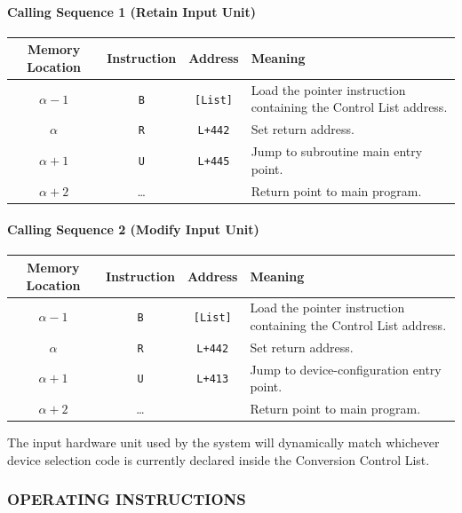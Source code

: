 \paragraph{Calling Sequence 1 (Retain Input Unit)}
\begin{table}[h!]
\centering
\begin{tabularx}{\textwidth}{cccX}
\toprule
\textbf{Memory Location} & \textbf{Instruction} & \textbf{Address} & \textbf{Meaning} \\
\midrule
$\alpha-1$   & \texttt{B} & \texttt{[List]} & Load the pointer instruction containing the Control List address. \\
$\alpha$     & \texttt{R} & \texttt{L+442}  & Set return address. \\
$\alpha+1$   & \texttt{U} & \texttt{L+445}  & Jump to subroutine main entry point. \\
$\alpha+2$   & \dots      &                  & Return point to main program. \\
\bottomrule
\end{tabularx}
\end{table}

\paragraph{Calling Sequence 2 (Modify Input Unit)}
\begin{table}[h!]
\centering
\begin{tabularx}{\textwidth}{cccX}
\toprule
\textbf{Memory Location} & \textbf{Instruction} & \textbf{Address} & \textbf{Meaning} \\
\midrule
$\alpha-1$   & \texttt{B} & \texttt{[List]} & Load the pointer instruction containing the Control List address. \\
$\alpha$     & \texttt{R} & \texttt{L+442}  & Set return address. \\
$\alpha+1$   & \texttt{U} & \texttt{L+413}  & Jump to device-configuration entry point. \\
$\alpha+2$   & \dots      &                  & Return point to main program. \\
\bottomrule
\end{tabularx}
\end{table}
The input hardware unit used by the system will dynamically match whichever device selection code is currently declared inside the Conversion Control List.

\subsubsection*{OPERATING INSTRUCTIONS}

